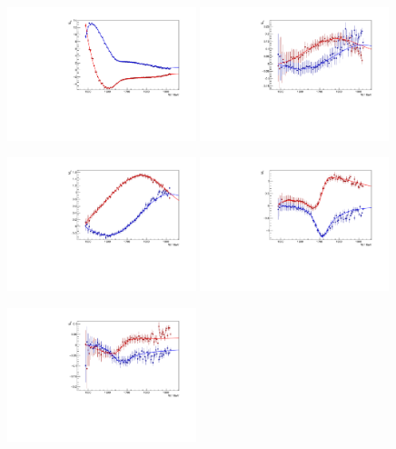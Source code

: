 \documentclass[a4paper,12pt]{report}
\begin{document}
\begin{figure}
  \begin{center}
    \centerline{
    \includegraphics[width=0.49\textwidth]{MAID2015a/Hedim/plots.0/E0p.pdf}
    \includegraphics[width=0.49\textwidth]{MAID2015a/Hedim/plots.0/E1p.pdf}
    }
    \centerline{
    \includegraphics[width=0.49\textwidth]{MAID2015a/Hedim/plots.0/M1p.pdf}
    \includegraphics[width=0.49\textwidth]{MAID2015a/Hedim/plots.0/M1m.pdf}
    }
    \centerline{
    \includegraphics[width=0.49\textwidth]{MAID2015a/Hedim/plots.0/E2p.pdf}
}
\end{center}
\end{figure}
\end{document}
